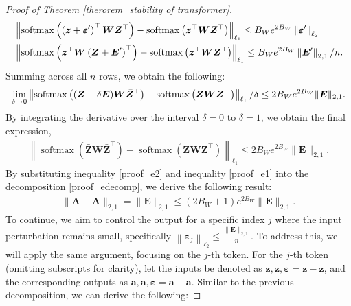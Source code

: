 \begin{proof}[Proof of Theorem \ref{therorem_stability of transformer}]
\begin{align} 
&\left\|\operatorname{softmax}\left(\left(\boldsymbol{z}+\boldsymbol{\varepsilon}^{\prime}\right)^{\top} \boldsymbol{W} \boldsymbol{Z}^{\top}\right)-\operatorname{softmax}\left(\boldsymbol{z}^{\top} \boldsymbol{W} \boldsymbol{Z}^{\top}\right)\right\|_{\ell_1} \leq B_W e^{2 B_W}\left\|\boldsymbol{\varepsilon}^{\prime}\right\|_{\ell_2} \notag\\ & \left\|\operatorname{softmax}\left(\boldsymbol{z}^{\top} \boldsymbol{W}\left(\boldsymbol{Z}+\boldsymbol{E}^{\prime}\right)^{\top}\right)-\operatorname{softmax}\left(\boldsymbol{z}^{\top} \boldsymbol{W} \boldsymbol{Z}^{\top}\right)\right\|_{\ell_1} \leq B_W e^{2 B_W}\left\|\boldsymbol{E}^{\prime}\right\|_{2,1} / n.\notag
\end{align}
Summing across all $n$ rows, we obtain the following:
\begin{align}
    \lim _{\delta \rightarrow 0}\left\|\operatorname{softmax}\left((\boldsymbol{Z}+\delta \boldsymbol{E}) \boldsymbol{W} \bar{\boldsymbol{Z}}^{\top}\right)-\operatorname{softmax}\left(\boldsymbol{Z} \boldsymbol{W} \boldsymbol{Z}^{\top}\right)\right\|_{\ell_1} / \delta \leq 2 B_W e^{2 B_W}\|\boldsymbol{E}\|_{2,1} \notag.
\end{align}
By integrating the derivative over the interval $\delta=0$ to $\delta=1$, we obtain the final expression,
\begin{align}
    \left\|\operatorname{softmax}\left(\bar{\boldsymbol{Z}} \boldsymbol{W} \bar{\boldsymbol{Z}}^{\top}\right)-\operatorname{softmax}\left(\boldsymbol{Z} \boldsymbol{W} \boldsymbol{Z}^{\top}\right)\right\|_{\ell_1} \leq 2 B_W e^{2 B_W}\|\boldsymbol{E}\|_{2,1} \label{proof_e2}.
\end{align}
By substituting inequality \ref{proof_e2} and inequality \ref{proof_e1} into the decomposition \ref{proof_edecomp}, we derive the following result:
\begin{align}
   \|\boldsymbol{\bar{A}}-\boldsymbol{A}\|_{2,1}= \|\bar{\boldsymbol{E}}\|_{2,1}\leq (2B_W+1)e^{2B_W}\|\boldsymbol{E}\|_{2,1} \label{proof_attenweightdifference}.
\end{align}
To continue, we aim to control the output for a specific index $j$ where the input perturbation remains small, specifically $\left\|\boldsymbol{\varepsilon}_j\right\|_{\ell_2} \leq \frac{\|\boldsymbol{E}\|_{2,1}}{n}$. To address this, we will apply the same argument, focusing on the $j$-th token. For the $j$-th token (omitting subscripts for clarity), let the inputs be denoted as $\boldsymbol{z}, \boldsymbol{\bar{z}}, \boldsymbol{\varepsilon}=\boldsymbol{\bar{z}}-\boldsymbol{z}$, and the corresponding outputs as $\boldsymbol{a}, \bar{\boldsymbol{a}}, \bar{\boldsymbol{\varepsilon}}=\bar{\boldsymbol{a}}-\boldsymbol{a}$. Similar to the previous decomposition, we can derive the following:

\end{proof}
